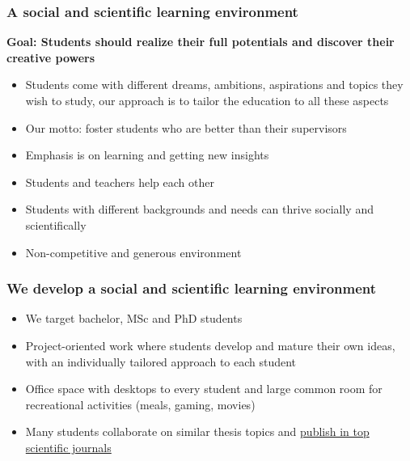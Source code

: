 \documentclass{beamer}
\begin{document}
\begin{frame}
\frametitle{A social and scientific learning environment}

\begin{block}{}
\textbf{Goal: Students should realize their full potentials and discover their creative powers}

\begin{itemize}
 \item Students come with different dreams, ambitions, aspirations and topics they wish to study, our approach is to tailor the education to all these aspects

 \item Our motto: foster students who are better than their supervisors

 \item Emphasis is on learning and getting new insights

 \item Students and teachers help each other

 \item Students with different backgrounds and needs can thrive socially and scientifically

 \item Non-competitive and generous environment
\end{itemize}

\noindent
\end{block}
\end{frame}

\begin{frame}
\frametitle{We develop a social and scientific learning environment}

\begin{block}{}
\begin{itemize}
\item We target bachelor, MSc and PhD students

\item Project-oriented work where students develop and mature their own ideas, with an individually tailored approach to each student

\item Office space with desktops to every student and large common room for recreational activities (meals, gaming, movies)

\item Many students collaborate on similar  thesis topics and \href{{http://www.dn.no/talent/2014/06/12/Utdannelse/sommervikar-ble-toppforsker}}{publish in top scientific journals}
\end{itemize}

\noindent
\end{block}
\end{frame}
\end{document}
